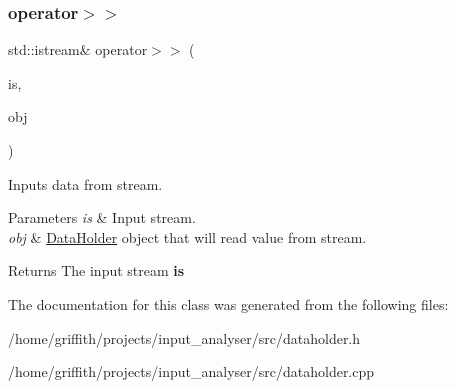 \subsubsection{\texorpdfstring{operator$>$$>$}{operator>>}}
{\footnotesize\ttfamily std\+::istream\& operator$>$$>$ (\begin{DoxyParamCaption}\item[{std\+::istream \&}]{is,  }\item[{\hyperlink{classDataHolder}{Data\+Holder} \&}]{obj }\end{DoxyParamCaption})\hspace{0.3cm}{\ttfamily [friend]}}

Inputs data from stream. 
\begin{DoxyParams}{Parameters}
{\em is} & Input stream. \\
\hline
{\em obj} & \hyperlink{classDataHolder}{Data\+Holder} object that will read value from stream. \\
\hline
\end{DoxyParams}
\begin{DoxyReturn}{Returns}
The input stream {\bfseries is} 
\end{DoxyReturn}


The documentation for this class was generated from the following files\+:\begin{DoxyCompactItemize}
\item 
/home/griffith/projects/input\+\_\+analyser/src/dataholder.\+h\item 
/home/griffith/projects/input\+\_\+analyser/src/dataholder.\+cpp\end{DoxyCompactItemize}
